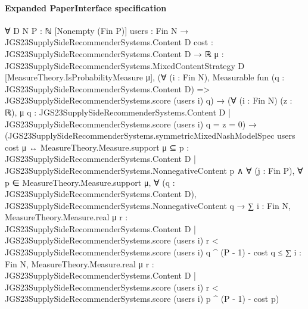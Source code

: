 \documentclass[10pt]{article}
\begin{document}
\paragraph{Expanded PaperInterface specification}
\begin{ReviewVerbatim}
∀ {D N P : ℕ} [Nonempty (Fin P)] {users : Fin N → JGS23SupplySideRecommenderSystems.Content D}
  {cost : JGS23SupplySideRecommenderSystems.Content D → ℝ}
  {μ : JGS23SupplySideRecommenderSystems.MixedContentStrategy D} [MeasureTheory.IsProbabilityMeasure μ],
  (∀ (i : Fin N),
      Measurable fun (q : JGS23SupplySideRecommenderSystems.Content D) =>
        JGS23SupplySideRecommenderSystems.score (users i) q) →
    (∀ (i : Fin N) (z : ℝ),
        μ {q : JGS23SupplySideRecommenderSystems.Content D | JGS23SupplySideRecommenderSystems.score (users i) q = z} =
          0) →
      (JGS23SupplySideRecommenderSystems.symmetricMixedNashModelSpec users cost μ ↔
        MeasureTheory.Measure.support μ ⊆
            {p : JGS23SupplySideRecommenderSystems.Content D | JGS23SupplySideRecommenderSystems.NonnegativeContent p} ∧
          ∀ (j : Fin P),
            ∀ p ∈ MeasureTheory.Measure.support μ,
              ∀ (q : JGS23SupplySideRecommenderSystems.Content D),
                JGS23SupplySideRecommenderSystems.NonnegativeContent q →
                  ∑ i : Fin N,
                        MeasureTheory.Measure.real μ
                            {r : JGS23SupplySideRecommenderSystems.Content D |
                              JGS23SupplySideRecommenderSystems.score (users i) r <
                                JGS23SupplySideRecommenderSystems.score (users i) q} ^
                          (P - 1) -
                      cost q ≤
                    ∑ i : Fin N,
                        MeasureTheory.Measure.real μ
                            {r : JGS23SupplySideRecommenderSystems.Content D |
                              JGS23SupplySideRecommenderSystems.score (users i) r <
                                JGS23SupplySideRecommenderSystems.score (users i) p} ^
                          (P - 1) -
                      cost p)
\end{ReviewVerbatim}
\end{document}
